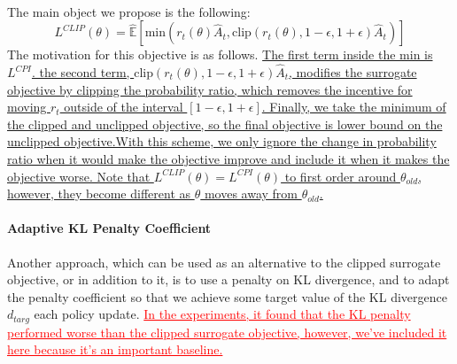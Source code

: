 \paragraph{}The main object we propose is the following:
\begin{equation}
L^{CLIP}(\theta) = \hat{\mathbb{E}}[\text{min}(r_{t}(\theta)\hat{A}_{t}, \text{clip}(r_{t}(\theta), 1-\epsilon, 1+\epsilon)\hat{A}_{t})]
\end{equation}
The motivation for this objective is as follows. \uline{The first term inside the min is $L^{CPI}$. the second term, $\text{clip}(r_{t}(\theta), 1-\epsilon, 1+\epsilon)\hat{A}_{t}$, modifies the surrogate objective by clipping the probability ratio, which removes the incentive for moving $r_{t}$ outside of the interval $[1-\epsilon, 1+\epsilon]$. Finally, we take the minimum of the clipped and unclipped objective, so the final objective is lower bound on the unclipped objective.With this scheme, we only ignore the change in probability ratio when it would make the objective improve and include it when it makes the objective worse. Note that $L^{CLIP}(\theta) = L^{CPI}(\theta)$ to first order around $\theta_{old}$, however, they become different as $\theta$ moves away from $\theta_{old}$.}

\paragraph{Adaptive KL Penalty Coefficient}
Another approach, which can be used as an alternative to the clipped surrogate objective, or in addition to it, is to use a penalty on KL divergence, and to adapt the penalty coefficient so that we achieve some target value of the KL divergence $d_{targ}$ each policy update. \textcolor{red}{\uline{In the experiments, it found that the KL penalty performed worse than the clipped surrogate objective, however, we've included it here because it's an important baseline.}}
